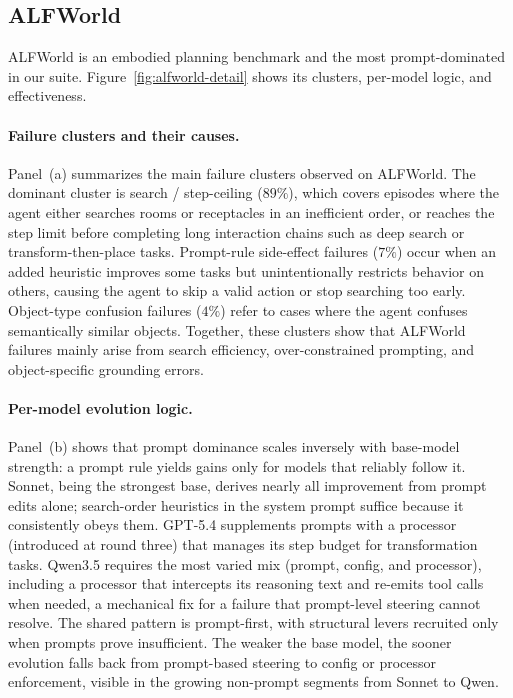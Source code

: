 \subsection{ALFWorld}
\label{app:alfworld-detail}

ALFWorld is an embodied planning benchmark and the most prompt-dominated in our
suite. Figure~\ref{fig:alfworld-detail} shows its clusters, per-model logic, and
effectiveness.

\paragraph{Failure clusters and their causes.} Panel~(a) summarizes the main failure clusters observed on ALFWorld. The dominant cluster is search / step-ceiling ($89\%$), which covers episodes where the agent either searches rooms or receptacles in an inefficient order, or reaches the step limit before completing long interaction chains such as deep search or transform-then-place tasks. Prompt-rule side-effect failures ($7\%$) occur when an added heuristic improves some tasks but unintentionally restricts behavior on others, causing the agent to skip a valid action or stop searching too early. Object-type confusion failures ($4\%$) refer to cases where the agent confuses semantically similar objects. Together, these clusters show that ALFWorld failures mainly arise from search efficiency, over-constrained prompting, and object-specific grounding errors.

\paragraph{Per-model evolution logic.} Panel~(b) shows that prompt dominance scales inversely with base-model strength: a prompt rule yields gains only for models that reliably follow it. Sonnet, being the strongest base, derives nearly all improvement from prompt edits alone; search-order heuristics in the system prompt suffice because it consistently obeys them. GPT-5.4 supplements prompts with a processor (introduced at round three) that manages its step budget for transformation tasks. Qwen3.5 requires the most varied mix (prompt, config, and processor), including a processor that intercepts its reasoning text and re-emits tool calls when needed, a mechanical fix for a failure that prompt-level steering cannot resolve. The shared pattern is prompt-first, with structural levers recruited only when prompts prove insufficient. The weaker the base model, the sooner evolution falls back from prompt-based steering to config or processor enforcement, visible in the growing non-prompt segments from Sonnet to Qwen.

